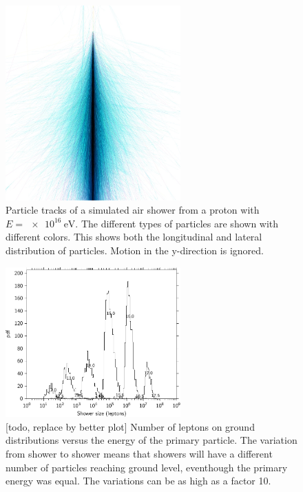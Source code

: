 \begin{figure}
    \centering
    \includegraphics[width=0.6\textwidth]
                    {plots/cosmic-rays/shower.jpg}
    \caption{Particle tracks of a simulated air shower from a proton with $E = \SI{e16}{\eV}$. The different types of particles are shown with different colors. This shows both the longitudinal and lateral distribution of particles. Motion in the y-direction is ignored. \cite{heck2013corsika}}
    \label{fig:shower}
\end{figure}

\begin{figure}
    \centering
    \includegraphics[width=0.6\textwidth]
                    {plots/cosmic-rays/shower_size_distribution}
    \caption{[todo, replace by better plot] Number of leptons on ground distributions versus the energy of the primary particle. The variation from shower to shower means that showers will have a different number of particles reaching ground level, eventhough the primary energy was equal. The variations can be as high as a factor 10. \cite{heck2013corsika}}
    \label{fig:shower_size_distribution}
\end{figure}


